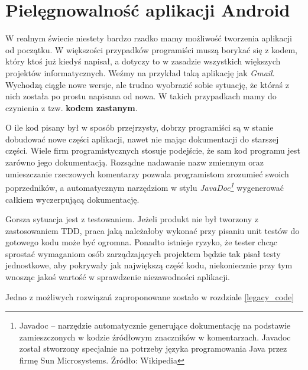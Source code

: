 \section{Pielęgnowalność aplikacji Android}
\label{pielegnowalnosc_aplikacji}
W realnym świecie niestety bardzo rzadko mamy możliwość tworzenia aplikacji od początku. W większości przypadków programiści muszą borykać się z kodem, który ktoś już kiedyś napisał, a dotyczy to w zasadzie wszystkich większych projektów informatycznych. Weźmy na przykład taką aplikację jak \textit{Gmail}. Wychodzą ciągle nowe wersje, ale trudno wyobrazić sobie sytuację, że któraś z nich została po prostu napisana od nowa. W takich przypadkach mamy do czynienia z tzw. \textbf{kodem zastanym}.

O ile kod pisany był w sposób przejrzysty, dobrzy programiści są w stanie dobudować nowe części aplikacji, nawet nie mając dokumentacji do starszej części. Wiele firm programistycznych stosuje podejście, że sam kod programu jest zarówno jego dokumentacją. Rozsądne nadawanie nazw zmiennym oraz umieszczanie rzeczowych komentarzy pozwala programistom zrozumieć swoich poprzedników, a automatycznym narzędziom w stylu \textit{JavaDoc\footnote{Javadoc – narzędzie automatycznie generujące dokumentację na podstawie zamieszczonych w kodzie źródłowym znaczników w komentarzach. Javadoc został stworzony specjalnie na potrzeby języka programowania Java przez firmę Sun Microsystems. Źródło: Wikipedia}} wygenerować całkiem wyczerpującą dokumentację.

Gorsza sytuacja jest z testowaniem. Jeżeli produkt nie był tworzony z zastosowaniem TDD, praca jaką należałoby wykonać przy pisaniu unit testów do gotowego kodu może być ogromna. Ponadto istnieje ryzyko, że tester chcąc sprostać wymaganiom osób zarządzających projektem będzie tak pisał testy jednostkowe, aby pokrywały jak największą część kodu, niekoniecznie przy tym wnosząc jakoś wartość w sprawdzenie niezawodności aplikacji.

Jedno z możliwych rozwiązań zaproponowane zostało w rozdziale \ref{legacy_code}
